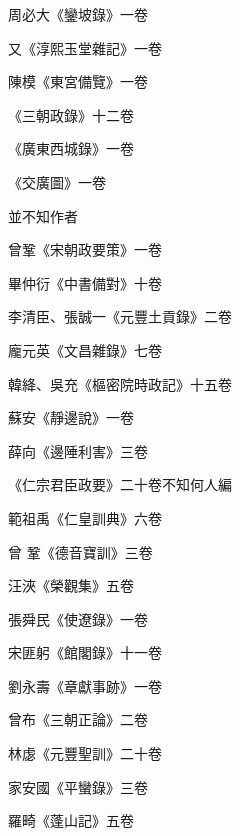 \begin{pinyinscope}
 周必大《鑾坡錄》一卷



 又《淳熙玉堂雜記》一卷



 陳模《東宮備覽》一卷



 《三朝政錄》十二卷



 《廣東西城錄》一卷



 《交廣圖》一卷



 並不知作者



 曾鞏《宋朝政要策》一卷



 畢仲衍《中書備對》十卷



 李清臣、張誠一《元豐土貢錄》二卷



 龐元英《文昌雜錄》七卷



 韓絳、吳充《樞密院時政記》十五卷



 蘇安《靜邊說》一卷



 薛向《邊陲利害》三卷



 《仁宗君臣政要》二十卷不知何人編



 範祖禹《仁皇訓典》六卷



 曾
 鞏《德音寶訓》三卷



 汪浹《榮觀集》五卷



 張舜民《使遼錄》一卷



 宋匪躬《館閣錄》十一卷



 劉永壽《章獻事跡》一卷



 曾布《三朝正論》二卷



 林虙《元豐聖訓》二十卷



 家安國《平蠻錄》三卷



 羅畸《蓬山記》五卷




\end{pinyinscope}
